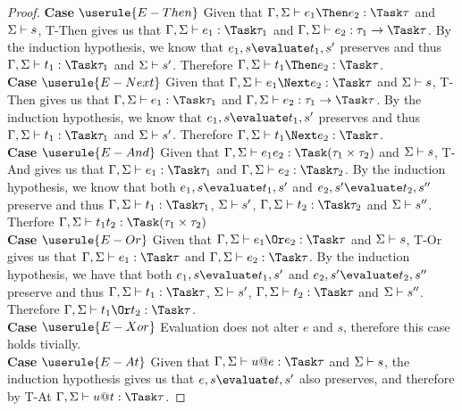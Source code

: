 \begin{proof}
  \noindent\textbf{Case} $\userule{E-Then}$
      Given that $\Gamma,\Sigma\infers e_1\Then e_2:\Task \tau$ and $\Sigma\vdash s$, T-Then gives us that $\Gamma,\Sigma\infers e_1:\Task\tau_1$
      and $\Gamma,\Sigma\infers e_2:\tau_1 \to \Task \tau$. By the induction hypothesis, we know that
      $e_1,s\evaluate t_1,s'$ preserves and thus $\Gamma,\Sigma\infers t_1:\Task\tau_1$ and $\Sigma\vdash s'$. Therefore
      $\Gamma,\Sigma\infers t_1\Then e_2:\Task\tau$.\\

  \noindent\textbf{Case} $\userule{E-Next}$
      Given that $\Gamma,\Sigma\infers e_1\Next e_2:\Task \tau$ and $\Sigma\vdash s$, T-Then gives us that $\Gamma,\Sigma\infers e_1:\Task\tau_1$
      and $\Gamma,\Sigma\infers e_2:\tau_1 \to \Task \tau$. By the induction hypothesis, we know that
      $e_1,s\evaluate t_1,s'$ preserves and thus $\Gamma,\Sigma\infers t_1:\Task\tau_1$ and $\Sigma\vdash s'$. Therefore
      $\Gamma,\Sigma\infers t_1\Next e_2:\Task\tau$.\\

  \noindent\textbf{Case} $\userule{E-And}$
      Given that $\Gamma,\Sigma\infers e_1\And e_2:\Task(\tau_1\times\tau_2)$ and $\Sigma\vdash s$, T-And gives us that
      $\Gamma,\Sigma\infers e_1:\Task\tau_1$ and $\Gamma,\Sigma\infers e_2:\Task\tau_2$. By the induction hypothesis, we
      know that both $e_1,s\evaluate t_1,s'$ and $e_2,s'\evaluate t_2,s''$ preserve and thus
      $\Gamma,\Sigma\infers t_1:\Task\tau_1$, $\Sigma\vdash s'$, $\Gamma,\Sigma\infers t_2:\Task\tau_2$ and $\Sigma\vdash s''$. Therfore
      $\Gamma,\Sigma\infers t_1\And t_2:\Task(\tau_1\times\tau_2)$\\

  \noindent\textbf{Case} $\userule{E-Or}$
      Given that $\Gamma,\Sigma\infers e_1\Or e_2:\Task\tau$ and $\Sigma\vdash s$, T-Or gives us that $\Gamma,\Sigma\infers e_1:\Task\tau$ and
      $\Gamma,\Sigma\infers e_2:\Task\tau$. By the induction hypothesis, we have that both
      $e_1,s\evaluate t_1,s'$ and $e_2,s'\evaluate t_2,s''$ preserve and thus $\Gamma,\Sigma\infers t_1:\Task\tau$, $\Sigma\vdash s'$,
      $\Gamma,\Sigma\infers t_2:\Task\tau$ and $\Sigma\vdash s''$. Therefore $\Gamma,\Sigma\infers t_1\Or t_2:\Task\tau$.\\

  \noindent\textbf{Case} $\userule{E-Xor}$
      Evaluation does not alter $e$ and $s$, therefore this case holds tivially.\\

  \noindent\textbf{Case} $\userule{E-At}$
      Given that $\Gamma,\Sigma\infers u@e:\Task\tau$ and $\Sigma\vdash s$, the induction hypothesis gives us that $e,s\evaluate t,s'$ also preserves, and therefore by T-At $\Gamma,\Sigma\infers u@t:\Task\tau$.
\end{proof}



